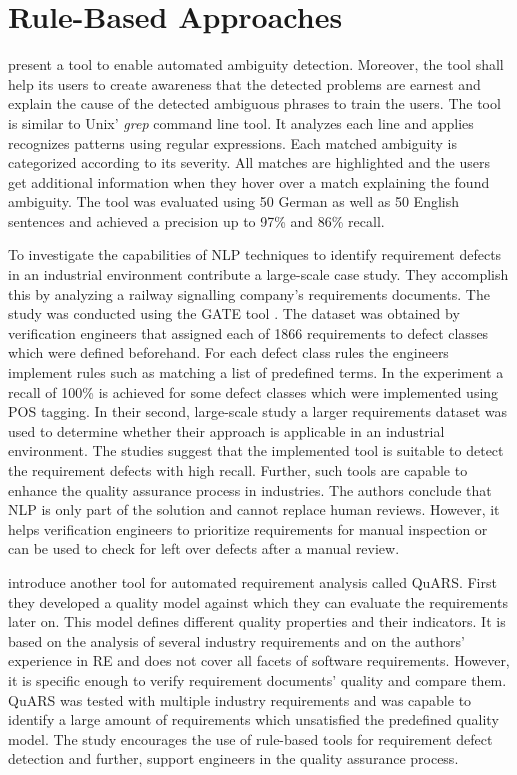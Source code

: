 \section{Rule-Based Approaches}
\label{chp:related_research:sec:rule_based approaches}

\textcite{Gleich:2010} present a tool to enable automated ambiguity detection.
Moreover, the tool shall help its users to create awareness that the detected problems are earnest and explain the cause of the detected ambiguous phrases to train the users.
The tool is similar to Unix' \textit{grep} command line tool.
It analyzes each line and applies recognizes patterns using regular expressions.
Each matched ambiguity is categorized according to its severity.
All matches are highlighted and the users get additional information when they hover over a match explaining the found ambiguity.
The tool was evaluated using 50 German as well as 50 English sentences and achieved a precision up to 97\% and 86\% recall.

To investigate the capabilities of \ac{NLP} techniques to identify requirement defects in an industrial environment \textcite{Rosadini:2017} contribute a large-scale case study.
They accomplish this by analyzing a railway signalling company's requirements documents.
The study was conducted using the \ac{GATE} tool \parencite{Cunningham:2002}.
The dataset was obtained by verification engineers that assigned each of 1866 requirements to defect classes which were defined beforehand.
For each defect class rules the engineers implement rules such as matching a list of predefined terms.
In the experiment a recall of 100\% is achieved for some defect classes which were implemented using \ac{POS} tagging.
In their second, large-scale study a larger requirements dataset was used to determine whether their approach is applicable in an industrial environment.
The studies suggest that the implemented tool is suitable to detect the requirement defects with high recall.
Further, such tools are capable to enhance the quality assurance process in industries.
The authors conclude that \ac{NLP} is only part of the solution and cannot replace human reviews.
However, it helps verification engineers to prioritize requirements for manual inspection or can be used to check for left over defects after a manual review.

\textcite{Fabbrini:2002} introduce another tool for automated requirement analysis called \ac{QuARS}.
First they developed a quality model against which they can evaluate the requirements later on.
This model defines different quality properties and their indicators.
It is based on the analysis of several industry requirements and on the authors' experience in \ac{RE} and does not cover all facets of software requirements.
However, it is specific enough to verify requirement documents' quality and compare them.
\Ac{QuARS} was tested with multiple industry requirements and was capable to identify a large amount of requirements which unsatisfied the predefined quality model.
The study encourages the use of rule-based tools for requirement defect detection and further, support engineers in the quality assurance process.

